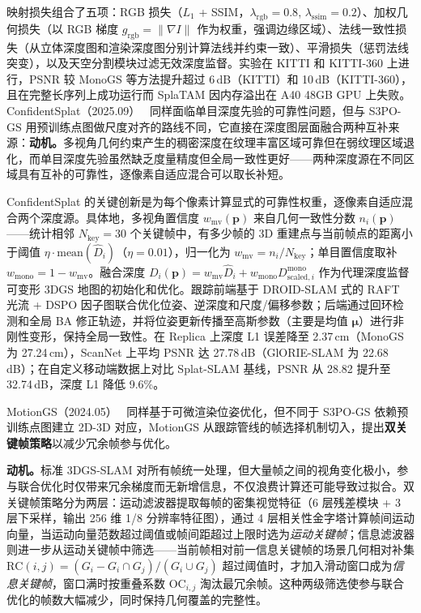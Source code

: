 映射损失组合了五项：RGB 损失（$L_1$ + SSIM，$\lambda_{\mathrm{rgb}}=0.8$, $\lambda_{\mathrm{ssim}}=0.2$）、加权几何损失（以 RGB 梯度 $g_{\mathrm{rgb}} = \|\nabla I\|$ 作为权重，强调边缘区域）、法线一致性损失（从立体深度图和渲染深度图分别计算法线并约束一致）、平滑损失（惩罚法线突变），以及天空分割模块过滤无效深度监督。实验在 KITTI 和 KITTI-360 上进行，PSNR 较 MonoGS 等方法提升超过 6\,dB（KITTI）和 10\,dB（KITTI-360），且在完整长序列上成功运行而 SplaTAM 因内存溢出在 A40 48GB GPU 上失败。ConfidentSplat（2025.09）~\cite{2509_16863} 同样面临单目深度先验的可靠性问题，但与 S3PO-GS 用预训练点图做尺度对齐的路线不同，它直接在深度图层面融合两种互补来源：\textbf{动机。}多视角几何约束产生的稠密深度在纹理丰富区域可靠但在弱纹理区域退化，而单目深度先验虽然缺乏度量精度但全局一致性更好——两种深度源在不同区域具有互补的可靠性，逐像素自适应混合可以取长补短。

ConfidentSplat 的关键创新是为每个像素计算显式的可靠性权重，逐像素自适应混合两个深度源。具体地，多视角置信度 $w_{\mathrm{mv}}(\mathbf{p})$ 来自几何一致性分数 $n_i(\mathbf{p})$——统计相邻 $N_{\mathrm{key}}=30$ 个关键帧中，有多少帧的 3D 重建点与当前帧点的距离小于阈值 $\eta \cdot \mathrm{mean}(\hat{D}_i)$（$\eta=0.01$），归一化为 $w_{\mathrm{mv}} = n_i / N_{\mathrm{key}}$；单目置信度取补 $w_{\mathrm{mono}} = 1 - w_{\mathrm{mv}}$。融合深度 $D_i(\mathbf{p}) = w_{\mathrm{mv}} \hat{D}_i + w_{\mathrm{mono}} D^{\mathrm{mono}}_{\mathrm{scaled},i}$ 作为代理深度监督可变形 3DGS 地图的初始化和优化。跟踪前端基于 DROID-SLAM 式的 RAFT 光流 + DSPO 因子图联合优化位姿、逆深度和尺度/偏移参数；后端通过回环检测和全局 BA 修正轨迹，并将位姿更新传播至高斯参数（主要是均值 $\bm{\mu}$）进行非刚性变形，保持全局一致性。在 Replica 上深度 L1 误差降至 2.37\,cm（MonoGS 为 27.24\,cm），ScanNet 上平均 PSNR 达 27.78\,dB（GlORIE-SLAM 为 22.68\,dB）；在自定义移动端数据上对比 Splat-SLAM 基线，PSNR 从 28.82 提升至 32.74\,dB，深度 L1 降低 9.6\%。

MotionGS（2024.05）~\cite{2405_11129} 同样基于可微渲染位姿优化，但不同于 S3PO-GS 依赖预训练点图建立 2D-3D 对应，MotionGS 从跟踪管线的帧选择机制切入，提出\textbf{双关键帧策略}以减少冗余帧参与优化。

\textbf{动机。}标准 3DGS-SLAM 对所有帧统一处理，但大量帧之间的视角变化极小，参与联合优化时仅带来冗余梯度而无新增信息，不仅浪费计算还可能导致过拟合。双关键帧策略分为两层：运动滤波器提取每帧的密集视觉特征（6 层残差模块 + 3 层下采样，输出 256 维 1/8 分辨率特征图），通过 4 层相关性金字塔计算帧间运动向量，当运动向量范数超过阈值或帧间距超过上限时选为\emph{运动关键帧}；信息滤波器则进一步从运动关键帧中筛选——当前帧相对前一信息关键帧的场景几何相对补集 $\mathrm{RC}(i,j) = (G_i - G_i \cap G_j)/(G_i \cup G_j)$ 超过阈值时，才加入滑动窗口成为\emph{信息关键帧}，窗口满时按重叠系数 $\mathrm{OC}_{i,j}$ 淘汰最冗余帧。这种两级筛选使参与联合优化的帧数大幅减少，同时保持几何覆盖的完整性。


